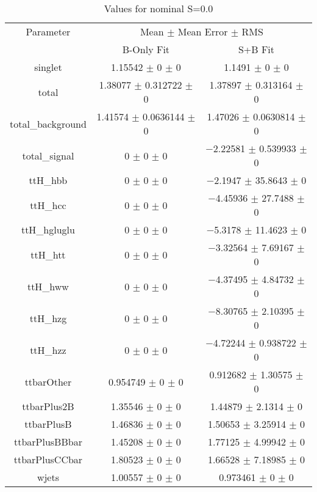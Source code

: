 \begin{table}
\centering
\caption{Values for nominal S=0.0}
\begin{tabular}{ccc}
\toprule
Parameter & \multicolumn{2}{c}{Mean $\pm$ Mean Error $\pm$ RMS}\\
 & B-Only Fit & S+B Fit\\
\midrule
singlet & \num{1.15542} $\pm$ \num{0} $\pm$ \num{0} & \num{1.1491} $\pm$ \num{0} $\pm$ \num{0}\\
total & \num{1.38077} $\pm$ \num{0.312722} $\pm$ \num{0} & \num{1.37897} $\pm$ \num{0.313164} $\pm$ \num{0}\\
total\_background & \num{1.41574} $\pm$ \num{0.0636144} $\pm$ \num{0} & \num{1.47026} $\pm$ \num{0.0630814} $\pm$ \num{0}\\
total\_signal & \num{0} $\pm$ \num{0} $\pm$ \num{0} & \num{-2.22581} $\pm$ \num{0.539933} $\pm$ \num{0}\\
ttH\_hbb & \num{0} $\pm$ \num{0} $\pm$ \num{0} & \num{-2.1947} $\pm$ \num{35.8643} $\pm$ \num{0}\\
ttH\_hcc & \num{0} $\pm$ \num{0} $\pm$ \num{0} & \num{-4.45936} $\pm$ \num{27.7488} $\pm$ \num{0}\\
ttH\_hgluglu & \num{0} $\pm$ \num{0} $\pm$ \num{0} & \num{-5.3178} $\pm$ \num{11.4623} $\pm$ \num{0}\\
ttH\_htt & \num{0} $\pm$ \num{0} $\pm$ \num{0} & \num{-3.32564} $\pm$ \num{7.69167} $\pm$ \num{0}\\
ttH\_hww & \num{0} $\pm$ \num{0} $\pm$ \num{0} & \num{-4.37495} $\pm$ \num{4.84732} $\pm$ \num{0}\\
ttH\_hzg & \num{0} $\pm$ \num{0} $\pm$ \num{0} & \num{-8.30765} $\pm$ \num{2.10395} $\pm$ \num{0}\\
ttH\_hzz & \num{0} $\pm$ \num{0} $\pm$ \num{0} & \num{-4.72244} $\pm$ \num{0.938722} $\pm$ \num{0}\\
ttbarOther & \num{0.954749} $\pm$ \num{0} $\pm$ \num{0} & \num{0.912682} $\pm$ \num{1.30575} $\pm$ \num{0}\\
ttbarPlus2B & \num{1.35546} $\pm$ \num{0} $\pm$ \num{0} & \num{1.44879} $\pm$ \num{2.1314} $\pm$ \num{0}\\
ttbarPlusB & \num{1.46836} $\pm$ \num{0} $\pm$ \num{0} & \num{1.50653} $\pm$ \num{3.25914} $\pm$ \num{0}\\
ttbarPlusBBbar & \num{1.45208} $\pm$ \num{0} $\pm$ \num{0} & \num{1.77125} $\pm$ \num{4.99942} $\pm$ \num{0}\\
ttbarPlusCCbar & \num{1.80523} $\pm$ \num{0} $\pm$ \num{0} & \num{1.66528} $\pm$ \num{7.18985} $\pm$ \num{0}\\
wjets & \num{1.00557} $\pm$ \num{0} $\pm$ \num{0} & \num{0.973461} $\pm$ \num{0} $\pm$ \num{0}\\
\bottomrule
\end{tabular}
\end{table}